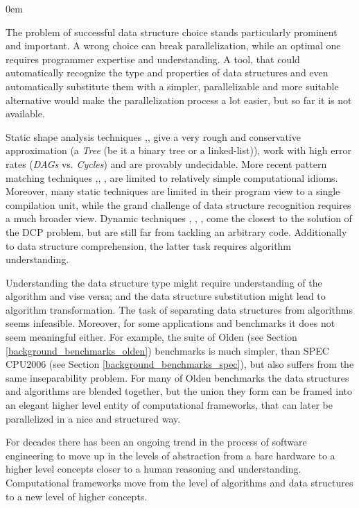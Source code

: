 \begin{description}[style=unboxed,leftmargin=0cm]
\itemsep0em
\item[\textit{Data-centric parallelization (DCP) problem}] The problem of successful data structure choice stands particularly prominent and important. A wrong choice can break parallelization, while an optimal one requires programmer expertise and understanding. A tool, that could automatically recognize the type and properties of data structures and even automatically substitute them with a simpler, parallelizable and more suitable alternative would make the parallelization process a lot easier, but so far it is not available.
\item[\textit{Limitations of "The state of the art" work}] Static shape analysis techniques \cite{Sagiv:1999:PSA:292540.292552},\cite{Wilhelm:2000:SA:647476.760384}, \cite{Ghiya:1996:TDC:237721.237724}
give a very rough and conservative approximation (a \textit{Tree} (be it a binary tree or a linked-list)), work with high error rates (\textit{DAGs} vs. \textit{Cycles}) and are provably undecidable. More recent pattern matching techniques \cite{Ginsbach:2018:CDS:3178372.3179515},\cite{Ginsbach:2017:DEG:3049832.3049862}, \cite{Ginsbach:2018:AML:3296957.3173182},\cite{Ginsbach:2018:AML:3296957.3173182} are limited to relatively simple computational idioms. Moreover, many static techniques are limited in their program view to a single compilation unit, while the grand challenge of data structure recognition requires a much broader view. Dynamic techniques \cite{Rupprecht:2017:DID:3155562.3155607}\cite{Haller:2016:SDS:2938006.2938029}, \cite{Haller:2016:SDS:2938006.2938029}, \cite{Rupprecht:2017:DID:3155562.3155607}, \cite{1669122} come the closest to the solution of the DCP problem, but are still far from tackling an arbitrary code. Additionally to data structure comprehension, the latter task requires algorithm understanding. 
\item[\textit{Data structure and algorithm inseparability}] Understanding the data structure type might require understanding of the algorithm and vise versa; and the data structure substitution might lead to algorithm transformation. The task of separating data structures from algorithms seems infeasible. Moreover, for some applications and benchmarks it does not seem meaningful either. For example, the suite of Olden (see Section \ref{background_benchmarks_olden}) benchmarks is much simpler, than SPEC CPU2006 (see Section \ref{background_benchmarks_spec}), but also suffers from the same inseparability problem. For many of Olden benchmarks the data structures and algorithms are blended together, but the union they form can be framed into an elegant higher level entity of computational frameworks, that can later be parallelized in a nice and structured way.
\item[\textit{The ever-going trend to higher abstraction levels}] For decades there has been an ongoing trend in the process of software engineering to move up in the levels of abstraction from a bare hardware to a higher level concepts closer to a human reasoning and understanding. Computational frameworks move from the level of algorithms and data structures to a new level of higher concepts.
\end{description}
